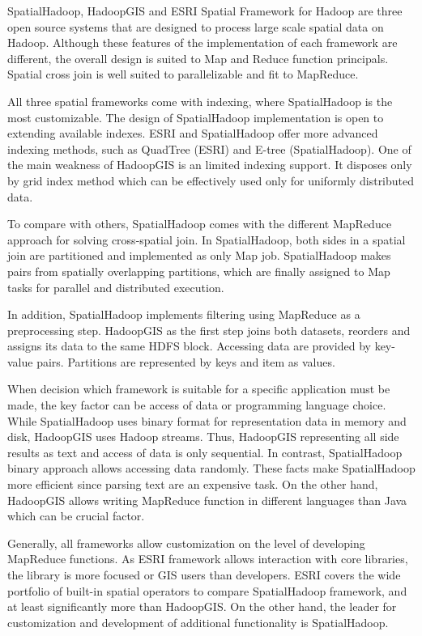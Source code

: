 \documentclass[a4paper,12pt,oneside]{report}
\begin{document}
	SpatialHadoop, HadoopGIS and ESRI Spatial Framework for Hadoop are
	three open source systems that are designed to process large scale
	spatial data on Hadoop. Although these features of  the implementation of each
	framework are different, 
	the overall design is suited to Map and Reduce function principals. Spatial
	cross join is well suited to parallelizable and fit to MapReduce. 
	
	All three spatial frameworks come with indexing, where SpatialHadoop is the most
	customizable. 
	The design of  SpatialHadoop implementation is open to extending available
	indexes. ESRI and 
	SpatialHadoop offer more advanced indexing methods, such as 
	QuadTree (ESRI) and E-tree (SpatialHadoop). One of the main weakness of HadoopGIS
	is an limited indexing 
	support. It disposes only by grid index method which can be 
	effectively used only for uniformly distributed data.

	To compare with others, SpatialHadoop comes with the different MapReduce
	approach for solving cross-spatial join.
	In SpatialHadoop, both sides in a spatial join are partitioned and 	
	implemented as only 
	Map job.  SpatialHadoop makes pairs from spatially overlapping partitions, which
	are finally 
	assigned to Map tasks for parallel and distributed execution.
	
	In addition, SpatialHadoop implements filtering using MapReduce as a
	preprocessing step.
	HadoopGIS as the first step joins both datasets, reorders and assigns its data to the
	same 
	HDFS block.  Accessing data are provided by key-value pairs. Partitions are
	represented by keys and item as values. 
	
	When decision which framework is suitable for a specific application must be
	made, the 
	key factor can be access of data  or programming language choice. While
	SpatialHadoop 
	uses binary format for representation data in memory and disk, HadoopGIS 
	uses Hadoop streams. Thus, HadoopGIS representing all side results as text and
	access 
	of data is only sequential. In contrast, SpatialHadoop binary approach allows 
	accessing data randomly.
	These facts make SpatialHadoop more efficient since parsing text are an
	expensive task. 
	On the other hand, HadoopGIS allows writing MapReduce function in different
	languages than Java which can be crucial factor. 
	
	
	Generally, all frameworks allow customization on the level of developing
	Map\-Reduce functions. As ESRI 
	framework allows interaction with core libraries, the library is more focused or
	GIS users than developers. 
	ESRI covers the wide portfolio of built-in spatial operators to compare
	SpatialHadoop framework, 
	and at least significantly more than HadoopGIS. On the other hand, the leader
	for customization and 
	development of additional functionality is SpatialHadoop.
	
\end{document}
